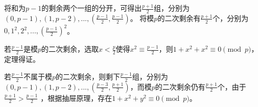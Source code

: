 \documentclass[
]{ctexart}
\begin{document}
将和为\(p-1\)的剩余两个一组的分开，可得出\(\frac{p+1}{2}\)组，分别为\((0,p-1), (1,p-2) , ... , ( \frac{p-1}{2}, \frac{p-1}{2})\)。
将模\(p\)的二次剩余有\(\frac{p+1}{2}\)个，分别为\(0,1^2,2^2,...,(\frac{p-1}{2})^2\)。

若\(\frac{p-1}{2}\)是模\(p\)的二次剩余，选取\(x< \frac{p}{2}\)使得\(x^2 \equiv \frac{p-1}{2}\)，则\(1 + x^2 + x^2 \equiv 0 \pmod{p}\)，定理得证。

若\(\frac{p-1}{2}\)不属于模\(p\)的二次剩余，则剩下\(\frac{p-1}{2}\)组，分别为\((0,p-1), (1,p-2) , ... , ( \frac{p-3}{2}, \frac{p+1}{2} )\)，而模\(p\)的二次剩余仍有\(\frac{p+1}{2}\)个，由于
\(\frac{p+1}{2} > \frac{p-1}{2}\)
，根据抽屉原理，存在\(1 + x^2 + y^2 \equiv 0 \pmod{p}\)。
\end{document}
